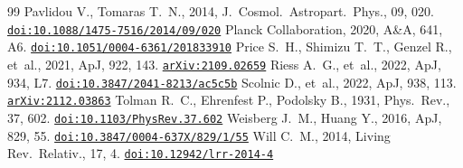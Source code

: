 \documentclass[11pt]{article}
\begin{document}
\begin{thebibliography}{99}
 Pavlidou V., Tomaras T.~N., 2014, J.\ Cosmol.\ Astropart.\ Phys., 09, 020. \href{https://doi.org/10.1088/1475-7516/2014/09/020}{\texttt{doi:10.1088/1475-7516/2014/09/020}}
 Planck Collaboration, 2020, A\&A, 641, A6. \href{https://doi.org/10.1051/0004-6361/201833910}{\texttt{doi:10.1051/0004-6361/201833910}}
 Price S.~H., Shimizu T.~T., Genzel R., et~al., 2021, ApJ, 922, 143. \href{https://arxiv.org/abs/2109.02659}{\texttt{arXiv:2109.02659}}
 Riess A.~G., et~al., 2022, ApJ, 934, L7. \href{https://doi.org/10.3847/2041-8213/ac5c5b}{\texttt{doi:10.3847/2041-8213/ac5c5b}}
 Scolnic D., et~al., 2022, ApJ, 938, 113. \href{https://arxiv.org/abs/2112.03863}{\texttt{arXiv:2112.03863}}
 Tolman R.~C., Ehrenfest P., Podolsky B., 1931, Phys.\ Rev., 37, 602. \href{https://doi.org/10.1103/PhysRev.37.602}{\texttt{doi:10.1103/PhysRev.37.602}}
 Weisberg J.~M., Huang Y., 2016, ApJ, 829, 55. \href{https://doi.org/10.3847/0004-637X/829/1/55}{\texttt{doi:10.3847/0004-637X/829/1/55}}
 Will C.~M., 2014, Living Rev.\ Relativ., 17, 4. \href{https://doi.org/10.12942/lrr-2014-4}{\texttt{doi:10.12942/lrr-2014-4}}
\end{thebibliography}
\end{document}
